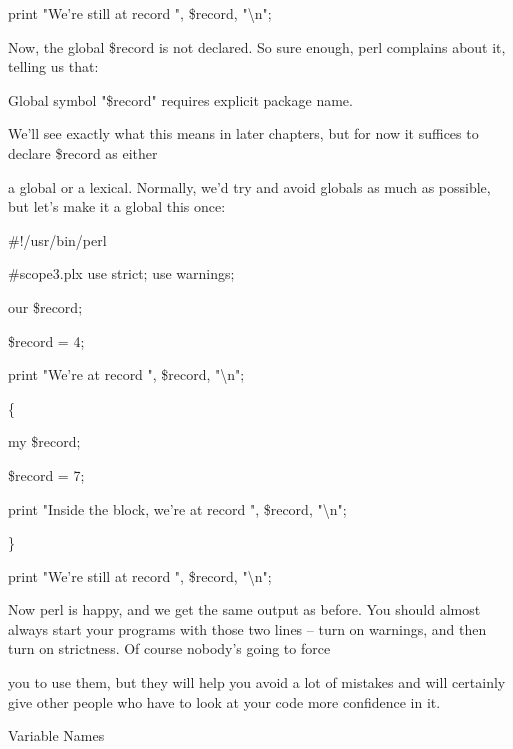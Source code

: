 \documentclass[a4paper,11pt]{book}
\begin{document}
\noindent print "We're still at record ", \$record, "\textbackslash n";

\noindent 

\noindent Now, the global \$record is not declared. So sure enough, perl complains about it, telling us that:

\noindent 

\noindent Global symbol "\$record" requires explicit package name.

\noindent 

\noindent 

\noindent We'll see exactly what this means in later chapters, but for now it suffices to declare \$record as either

\noindent a global or a lexical. Normally, we'd try and avoid globals as much as possible, but let's make it a global this once:

\noindent 

\noindent \#!/usr/bin/perl

\noindent \#scope3.plx use strict; use warnings;

\noindent our \$record;

\noindent \$record = 4;

\noindent print "We're at record ", \$record, "\textbackslash n";

\noindent 

\noindent \{

\noindent my \$record;

\noindent \$record = 7;

\noindent print "Inside the block, we're at record ", \$record, "\textbackslash n";

\noindent \}

\noindent 

\noindent print "We're still at record ", \$record, "\textbackslash n";

\noindent 

\noindent Now perl is happy, and we get the same output as before. You should almost always start your programs with those two lines -- turn on warnings, and then turn on strictness. Of course nobody's going to force

\noindent you to use them, but they will help you avoid a lot of mistakes and will certainly give other people who have to look at your code more confidence in it.

\noindent 

\noindent Variable Names

\noindent 
\end{document}
